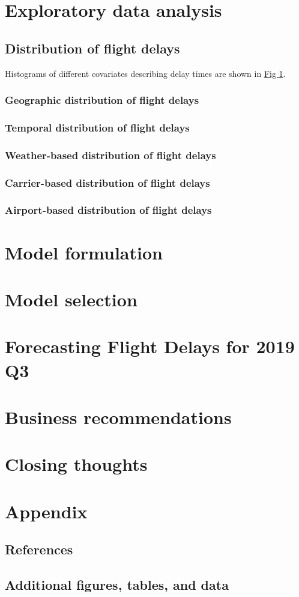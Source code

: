 \documentclass[12pt, a4paper]{book}
\newcommand\tab[1][1cm]{\hspace*{#1}}
\begin{document}
\chapter{Exploratory data analysis}
	\section{Distribution of flight delays}
	\tab Histograms of different covariates describing delay times are shown in \underline{Fig 1}. 
		\subsection{Geographic distribution of flight delays}
		\subsection{Temporal distribution of flight delays}
		\subsection{Weather-based distribution of flight delays}
		\subsection{Carrier-based distribution of flight delays}
		\subsection{Airport-based distribution of flight delays}
\chapter{Model formulation}
\chapter{Model selection}
\chapter{Forecasting Flight Delays for 2019 Q3}
\chapter{Business recommendations}
\chapter{Closing thoughts}
\chapter{Appendix}
	\section{References}
	\section{Additional figures, tables, and data}
\pagebreak


\nocite{*}

\end{document}
